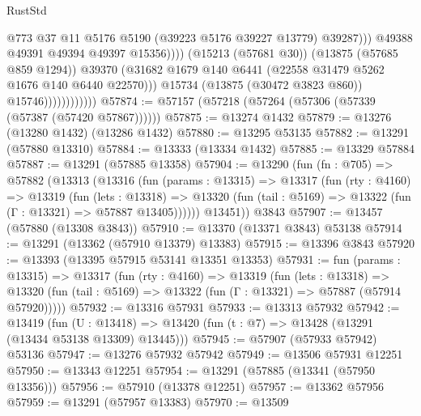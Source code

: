 \begin{lexlean}{RustStd}
\begin{coremodule}
                                            @773
                                            @37
                                            @11
                                            @5176
                                            @5190
                                            (@39223 @5176 @39227 @13779)
                                            @39287)))
                                      @49388
                                      @49391
                                      @49394
                                      @49397
                                      @15356))))
                              (@15213 (@57681 @30))
                              (@13875 (@57685 @859 @1294))
                              @39370
                              (@31682
                                @1679
                                @140
                                @6441
                                (@22558 @31479 @5262 @1676 @140 @6440 @22570)))
                            @15734
                            (@13875 (@30472 @3823 @860))
                            @15746))))))))))))
@57874 := @57157 (@57218 (@57264 (@57306 (@57339 (@57387 (@57420 @57867))))))
@57875 := @13274 @1432
@57879 := @13276 (@13280 @1432) (@13286 @1432)
@57880 := @13295 @53135
@57882 := @13291 (@57880 @13310)
@57884 := @13333 (@13334 @1432)
@57885 := @13329 @57884
@57887 := @13291 (@57885 @13358)
@57904 := @13290
    (fun (fn : @705) =>
    @57882
      (@13313
        (@13316
          (fun (params : @13315) =>
          @13317
            (fun (rty : @4160) =>
            @13319
              (fun (lets : @13318) =>
              @13320 (fun (tail : @5169) => @13322 (fun (Γ : @13321) => @57887 @13405))))))
        @13451))
    @3843
@57907 := @13457 (@57880 (@13308 @3843))
@57910 := @13370 (@13371 @3843) @53138
@57914 := @13291 (@13362 (@57910 @13379) @13383)
@57915 := @13396 @3843
@57920 := @13393 (@13395 @57915 @53141 @13351 @13353)
@57931 := fun (params : @13315) =>
  @13317
    (fun (rty : @4160) =>
    @13319
      (fun (lets : @13318) =>
      @13320 (fun (tail : @5169) => @13322 (fun (Γ : @13321) => @57887 (@57914 @57920)))))
@57932 := @13316 @57931
@57933 := @13313 @57932
@57942 := @13419
    (fun (U : @13418) => @13420 (fun (t : @7) => @13428 (@13291 (@13434 @53138 @13309) @13445)))
@57945 := @57907 (@57933 @57942) @53136
@57947 := @13276 @57932 @57942
@57949 := @13506 @57931 @12251
@57950 := @13343 @12251
@57954 := @13291 (@57885 (@13341 (@57950 @13356)))
@57956 := @57910 (@13378 @12251)
@57957 := @13362 @57956
@57959 := @13291 (@57957 @13383)
@57970 := @13509

\end{coremodule}
\end{lexlean}
